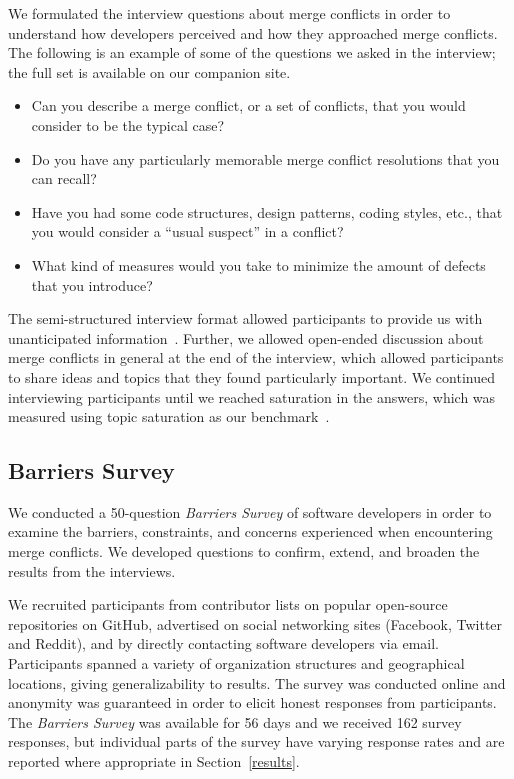 We formulated the interview questions about merge conflicts in order to understand how developers perceived and how they approached merge conflicts.
The following is an example of some of the questions we asked in the interview; the full set is available on our companion site.
\begin{itemize}
	\item Can you describe a merge conflict, or a set of conflicts, that you would consider to be the typical case?
	\item Do you have any particularly memorable merge conflict resolutions that you can recall?
	\item Have you had some code structures, design patterns, coding styles, etc., that you would consider a ``usual suspect'' in a conflict?
	\item What kind of measures would you take to minimize the amount of defects that you introduce?
\end{itemize}

The semi-structured interview format allowed participants to provide us with unanticipated information~\cite{seaman2008qualitative}. 
Further, we allowed open-ended discussion about merge conflicts in general at the end of the interview, which allowed participants to share ideas and topics that they found particularly important. 
We continued interviewing participants until we reached saturation in the answers, which was measured using topic saturation as our benchmark~\cite{fusch2015we}.

\subsection{Barriers Survey}\label{perceptions_survey}

We conducted a 50-question \textit{Barriers Survey} of software developers in order to examine the barriers, constraints, and concerns experienced when encountering merge conflicts.
We developed questions to confirm, extend, and broaden the results from the interviews.

\renewcommand*{\thefootnote}{\arabic{footnote}}
We recruited participants from contributor lists on popular open-source repositories on GitHub, advertised on social networking sites (Facebook, Twitter and Reddit), and by directly contacting software developers via email. 
Participants spanned a variety of organization structures and geographical locations, giving generalizability to results.
The survey was conducted online and anonymity was guaranteed in order to elicit honest responses from participants.
The \textit{Barriers Survey} was available for 56 days and we received 162 survey responses, but individual parts of the survey have varying response rates and are reported where appropriate in Section~\ref{results}.


